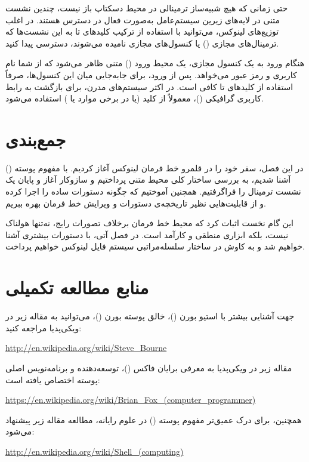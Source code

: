 حتی زمانی که هیچ شبیه‌ساز ترمینالی در محیط دسکتاپ باز نیست، چندین نشست متنی در لایه‌های زیرین سیستم‌عامل به‌صورت فعال در دسترس هستند. در اغلب توزیع‌های لینوکس، می‌توانید با استفاده از ترکیب کلیدهای  تا  به این نشست‌ها که ترمینال‌های مجازی () یا کنسول‌های مجازی نامیده می‌شوند، دسترسی پیدا کنید.

هنگام ورود به یک کنسول مجازی، یک محیط ورود () متنی ظاهر می‌شود که از شما نام کاربری و رمز عبور می‌خواهد. پس از ورود، برای جابه‌جایی میان این کنسول‌ها، صرفاً استفاده از کلیدهای  تا  کافی است. در اکثر سیستم‌های مدرن، برای بازگشت به رابط کاربری گرافیکی ()، معمولاً از کلید  (یا در برخی موارد  یا ) استفاده می‌شود.

\section{جمع‌بندی}

در این فصل، سفر خود را در قلمرو خط فرمان لینوکس آغاز کردیم. با مفهوم پوسته () آشنا شدیم، به بررسی ساختار کلی محیط متنی پرداختیم و سازوکار آغاز و پایان یک نشست ترمینال را فراگرفتیم. همچنین آموختیم که چگونه دستورات ساده را اجرا کرده و از قابلیت‌هایی نظیر تاریخچه‌ی دستورات و ویرایش خط فرمان بهره ببریم.

این گام نخست اثبات کرد که محیط خط فرمان برخلاف تصورات رایج، نه‌تنها هولناک نیست، بلکه ابزاری منطقی و کارآمد است. در فصل آتی، با دستورات بیشتری آشنا خواهیم شد و به کاوش در ساختار سلسله‌مراتبی سیستم فایل لینوکس خواهیم پرداخت.

\section{منابع مطالعه تکمیلی}

جهت آشنایی بیشتر با استیو بورن ()، خالق پوسته بورن ()، می‌توانید به مقاله زیر در ویکی‌پدیا مراجعه کنید:

\begin{latin}
\url{http://en.wikipedia.org/wiki/Steve_Bourne}
\end{latin}

مقاله زیر در ویکی‌پدیا به معرفی برایان فاکس ()، توسعه‌دهنده و برنامه‌نویس اصلی پوسته  اختصاص یافته است:

\begin{latin}
\url{https://en.wikipedia.org/wiki/Brian_Fox_(computer_programmer)}
\end{latin}

همچنین، برای درک عمیق‌تر مفهوم پوسته () در علوم رایانه، مطالعه مقاله زیر پیشنهاد می‌شود:

\begin{latin}
\url{http://en.wikipedia.org/wiki/Shell_(computing)}
\end{latin}